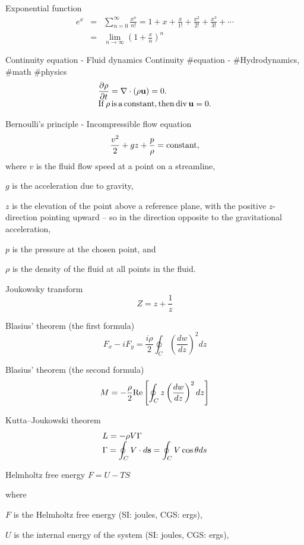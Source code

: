 Exponential function 
$$
\begin{array}{lll}
e^x &=& \displaystyle \sum^\infty_{n=0}\frac{x^n}{n!}=1+x+\frac{x}{1!}+\frac{x^2}{2!}+\frac{x^3}{3!}+\cdots \\
&=& \displaystyle \lim_{n\rightarrow\infty}\left(1+\frac{x}{n}\right)^n
\end{array}
$$

Continuity equation - Fluid dynamics Continuity #equation - #Hydrodynamics, #math #physics
$$
\begin{array}{l}
\displaystyle \frac{\partial \rho}{\partial t}=\nabla\cdot(\rho{\bf u})=0. \\
{\rm If}\, \rho\, {\rm is}\, {\rm a}\, {\rm constant}, {\rm then}\, {\rm div}\,{\bf u}=0.
\end{array}
$$


Bernoulli's principle - Incompressible flow equation
$$
\displaystyle \frac{v^2}{2}+g z+\frac{p}{\rho} = {\rm constant},
$$
where 
$v$ is the fluid flow speed at a point on a streamline,

$g$ is the acceleration due to gravity,

$z$ is the elevation of the point above a reference plane, with the positive $z$-direction pointing upward – so in the direction opposite to the gravitational acceleration,

$p$ is the pressure at the chosen point, and

$\rho$ is the density of the fluid at all points in the fluid.


Joukowsky transform
$$
Z=z+\frac{1}{z}
$$

Blasius' theorem (the first formula)
$$
\displaystyle F_x-i F_y=\displaystyle \frac{i\rho}{2}\oint_C\left(\frac{dw}{dz}\right)^2dz
$$

Blasius' theorem (the second formula)
$$
\displaystyle M=\displaystyle -\frac{\rho}{2}{\rm Re}\left[\oint_C z\left(\frac{dw}{dz}\right)^2dz\right]
$$

Kutta–Joukowski theorem
$$
\begin{array}{l}
\displaystyle L=\displaystyle -\rho V \Gamma \\
\displaystyle \Gamma=\displaystyle \oint_C V\cdot d{\bf s}=\oint_C V\cos\theta ds
\end{array}
$$

Helmholtz free energy
$F = U -TS$

where

$F$  is the Helmholtz free energy (SI: joules, CGS: ergs),

$U$  is the internal energy of the system (SI: joules, CGS: ergs),

